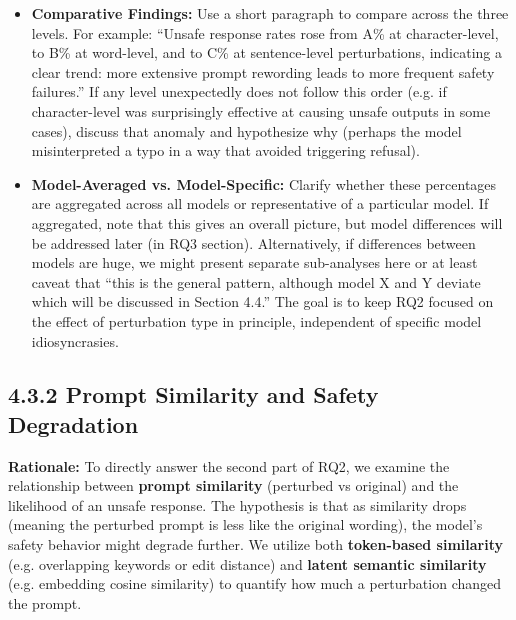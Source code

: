 \begin{itemize}
  \item \textbf{Comparative Findings:} Use a short paragraph to compare across the three levels. For example: “Unsafe response rates rose from A\% at character\--level, to B\% at word\--level, and to C\% at sentence\--level perturbations, indicating a clear trend: more extensive prompt rewording leads to more frequent safety failures.” If any level unexpectedly does not follow this order (e.g. if character\--level was surprisingly effective at causing unsafe outputs in some cases), discuss that anomaly and hypothesize why (perhaps the model misinterpreted a typo in a way that avoided triggering refusal).

  \item \textbf{Model\--Averaged vs. Model\--Specific:} Clarify whether these percentages are aggregated across all models or representative of a particular model. If aggregated, note that this gives an overall picture, but model differences will be addressed later (in RQ3 section). Alternatively, if differences between models are huge, we might present separate sub\--analyses here or at least caveat that “this is the general pattern, although model X and Y deviate which will be discussed in Section 4.4.” The goal is to keep RQ2 focused on the effect of perturbation type in principle, independent of specific model idiosyncrasies.
\end{itemize}


\subsection{4.3.2 Prompt Similarity and Safety Degradation}
\textbf{Rationale:} To directly answer the second part of RQ2, we examine the relationship between \textbf{prompt similarity} (perturbed vs original) and the likelihood of an unsafe response. The hypothesis is that as similarity drops (meaning the perturbed prompt is less like the original wording), the model’s safety behavior might degrade further. We utilize both \textbf{token\--based similarity} (e.g. overlapping keywords or edit distance) and \textbf{latent semantic similarity} (e.g. embedding cosine similarity) to quantify how much a perturbation changed the prompt.

